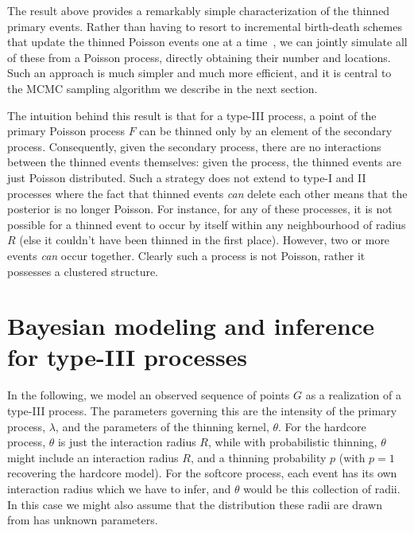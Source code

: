 \documentclass{statsoc}
\begin{document}
The result above provides a remarkably simple characterization of the thinned primary events. 
Rather than having to resort to incremental birth-death schemes that update the thinned Poisson events one at a time~\citep{green03, adamsthesis}, we can 
jointly simulate all of these from a Poisson process, directly obtaining their number and locations. 
Such an approach is much simpler and much more efficient, and it is
central to the MCMC sampling algorithm  we describe in the next section.

The intuition behind this result is that for a type-III process, a point of the primary Poisson process $F$ can
be thinned only by an element of the secondary process. Consequently, given the
secondary process, there are no interactions between the thinned events themselves: given the \matern process, the thinned events are just 
Poisson distributed. Such a strategy does not extend to
\matern type-I and II processes where the fact that thinned events \emph{can} delete each other means that the posterior is
no longer Poisson. For instance, for any of these processes, it is not possible for a thinned event to occur by itself within any neighbourhood
of radius $R$ (else it couldn't have been thinned in the first place). However, two or more events \emph{can} occur together. Clearly such a process is not 
Poisson, rather it possesses a clustered structure.


\section{Bayesian modeling and inference for \matern type-III processes} \label{sec:inf_mat}


  In the following, we model an observed sequence of points $G$ as a realization of a \matern type-III process. The parameters governing this are
the intensity of the primary process, $\lambda$, and the parameters of the thinning kernel, $\theta$. For the hardcore process, $\theta$ is just
the interaction radius $R$, while with probabilistic thinning, $\theta$ might include an interaction radius $R$, and a thinning
probability $p$ (with $p = 1$ recovering the hardcore model). 
For the softcore process, each \matern event has its own interaction radius which we have to
infer, and $\theta$ would be this collection of radii. In this case we might also assume that the distribution these radii are drawn from 
has unknown parameters.
\end{document}
